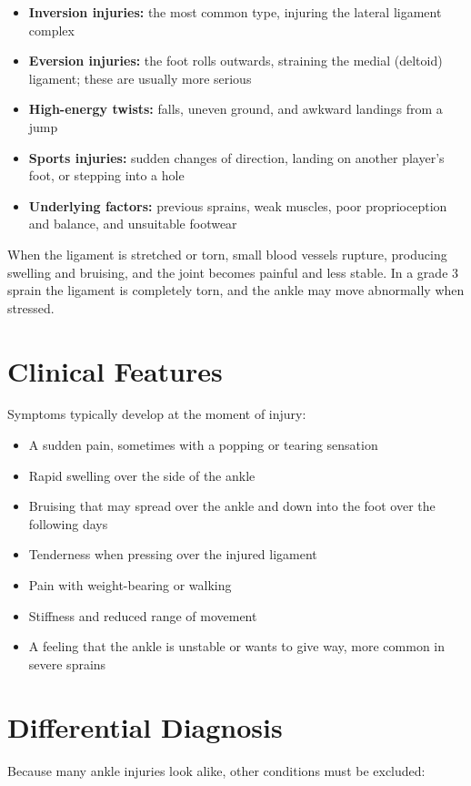 \begin{itemize}
    \item \textbf{Inversion injuries:} the most common type, injuring the lateral ligament complex
    \item \textbf{Eversion injuries:} the foot rolls outwards, straining the medial (deltoid) ligament; these are usually more serious
    \item \textbf{High-energy twists:} falls, uneven ground, and awkward landings from a jump
    \item \textbf{Sports injuries:} sudden changes of direction, landing on another player's foot, or stepping into a hole
    \item \textbf{Underlying factors:} previous sprains, weak muscles, poor proprioception and balance, and unsuitable footwear
\end{itemize}

When the ligament is stretched or torn, small blood vessels rupture, producing swelling and bruising, and the joint becomes painful and less stable. In a grade 3 sprain the ligament is completely torn, and the ankle may move abnormally when stressed.

\section*{Clinical Features}
Symptoms typically develop at the moment of injury:

\begin{itemize}
    \item A sudden pain, sometimes with a popping or tearing sensation
    \item Rapid swelling over the side of the ankle
    \item Bruising that may spread over the ankle and down into the foot over the following days
    \item Tenderness when pressing over the injured ligament
    \item Pain with weight-bearing or walking
    \item Stiffness and reduced range of movement
    \item A feeling that the ankle is unstable or wants to give way, more common in severe sprains
\end{itemize}

\section*{Differential Diagnosis}
Because many ankle injuries look alike, other conditions must be excluded:


